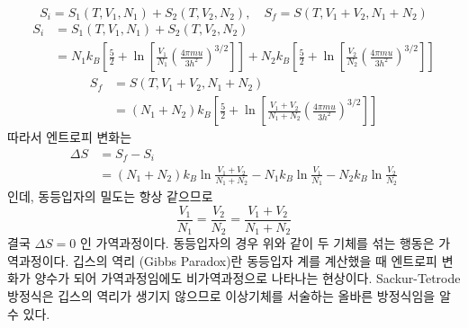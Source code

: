 \documentclass[a4paper,12pt]{report}
\begin{document}
	$$S_i=S_1(T,V_1,N_1)+S_2(T,V_2,N_2),\quad S_f=S(T,V_1+V_2,N_1+N_2)$$
	\begin{equation*}
		\begin{split}
		S_i&=S_1(T,V_1,N_1)+S_2(T,V_2,N_2)\\
		&=N_1k_B\left[\frac{5}{2}+\ln\left[\frac{V_1}{N_1}\left(\frac{4\pi mu}{3h^2} \right)^{3/2}  \right]  \right]+N_2k_B\left[\frac{5}{2}+\ln\left[\frac{V_2}{N_2}\left(\frac{4\pi mu}{3h^2} \right)^{3/2}  \right]  \right]
		\end{split}
	\end{equation*}
	\begin{equation*}
	\begin{split}
	S_f&=S(T,V_1+V_2,N_1+N_2)\\
	&=(N_1+N_2)k_B\left[\frac{5}{2}+\ln\left[\frac{V_1+V_2}{N_1+N_2}\left(\frac{4\pi mu}{3h^2} \right)^{3/2}  \right]  \right]
	\end{split}
	\end{equation*}
		따라서 엔트로피 변화는 
	\begin{equation*}
	\begin{split}
	\Delta S&=S_f-S_i\\
	&=(N_1+N_2)k_B\ln\frac{V_1+V_2}{N_1+N_2}-N_1k_B\ln\frac{V_1}{N_1}-N_2k_B\ln\frac{V_2}{N_2}
	\end{split}
	\end{equation*}
	인데, 동등입자의 밀도는 항상 같으므로
	$$\frac{V_1}{N_1}=\frac{V_2}{N_2}=\frac{V_1+V_2}{N_1+N_2}$$
	결국 $\Delta S=0$ 인 가역과정이다. 동등입자의 경우 위와 같이 두 기체를 섞는 행동은 가역과정이다. 깁스의 역리 (Gibbs Paradox)란 동등입자 계를 계산했을 때 엔트로피 변화가 양수가 되어 가역과정임에도 비가역과정으로 나타나는 현상이다. Sackur-Tetrode 방정식은 깁스의 역리가 생기지 않으므로 이상기체를 서술하는 올바른 방정식임을 알 수 있다.  
\end{document}
